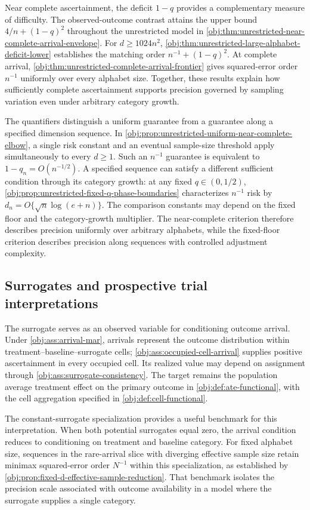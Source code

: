 \documentclass[11pt]{article}
\begin{document}
Near complete ascertainment, the deficit \(1-q\) provides a complementary measure of difficulty. The observed-outcome contrast attains the upper bound \(4/n+(1-q)^2\) throughout the unrestricted model in \cref{obj:thm:unrestricted-near-complete-arrival-envelope}. For \(d\ge1024n^2\), \cref{obj:thm:unrestricted-large-alphabet-deficit-lower} establishes the matching order \(n^{-1}+(1-q)^2\). At complete arrival, \cref{obj:thm:unrestricted-complete-arrival-frontier} gives squared-error order \(n^{-1}\) uniformly over every alphabet size. Together, these results explain how sufficiently complete ascertainment supports precision governed by sampling variation even under arbitrary category growth.

The quantifiers distinguish a uniform guarantee from a guarantee along a specified dimension sequence. In \cref{obj:prop:unrestricted-uniform-near-complete-elbow}, a single risk constant and an eventual sample-size threshold apply simultaneously to every \(d\ge1\). Such an \(n^{-1}\) guarantee is equivalent to \(1-q_n=O(n^{-1/2})\). A specified sequence can satisfy a different sufficient condition through its category growth: at any fixed \(q\in(0,1/2)\), \cref{obj:prop:unrestricted-fixed-q-phase-boundaries} characterizes \(n^{-1}\) risk by \(d_n=O\{\sqrt n\log(e+n)\}\). The comparison constants may depend on the fixed floor and the category-growth multiplier. The near-complete criterion therefore describes precision uniformly over arbitrary alphabets, while the fixed-floor criterion describes precision along sequences with controlled adjustment complexity.

\subsection{Surrogates and prospective trial interpretations}

The surrogate serves as an observed variable for conditioning outcome arrival. Under \cref{obj:ass:arrival-mar}, arrivals represent the outcome distribution within treatment--baseline--surrogate cells; \cref{obj:ass:occupied-cell-arrival} supplies positive ascertainment in every occupied cell. Its realized value may depend on assignment through \cref{obj:ass:surrogate-consistency}. The target remains the population average treatment effect on the primary outcome in \cref{obj:def:ate-functional}, with the cell aggregation specified in \cref{obj:def:cell-functional}.

The constant-surrogate specialization provides a useful benchmark for this interpretation. When both potential surrogates equal zero, the arrival condition reduces to conditioning on treatment and baseline category. For fixed alphabet size, sequences in the rare-arrival slice with diverging effective sample size retain minimax squared-error order \(N^{-1}\) within this specialization, as established by \cref{obj:prop:fixed-d-effective-sample-reduction}. That benchmark isolates the precision scale associated with outcome availability in a model where the surrogate supplies a single category.
\end{document}
